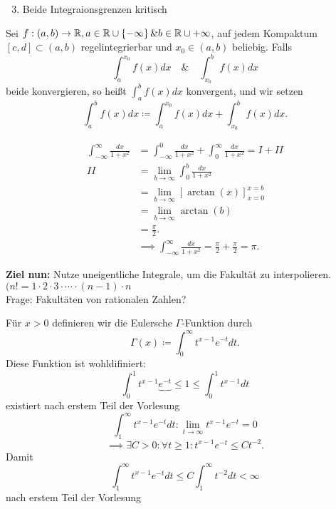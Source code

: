 \begin{enumerate}[label=(\Alph*)]
	\setcounter{enumi}{2}
	\item Beide Integraionsgrenzen kritisch
\end{enumerate}

\begin{subdefinition}
	Sei $ f: (a, b) \to \mathbb{R}, a \in \mathbb{R} \cup \left\{ -\infty \right\} \& b \in \mathbb{R} \cup {+\infty} $, auf jedem Kompaktum $ [c, d] \subset (a, b) $ regelintegrierbar und $ x_0 \in (a, b) $ beliebig. Falls
	\[
		\int_{a}^{x_0}f(x) dx \quad \& \quad \int_{x_0}^{b}f(x) dx
	\]
	beide konvergieren, so heißt $ \int_{a}^{b} f(x) dx $ konvergent, und wir setzen
	\[
		\int_{a}^{b}f(x) dx \coloneqq \int_{a}^{x_0} f(x) dx + \int_{x_0}^{b} f(x) dx.
	\]
	
\end{subdefinition}

\begin{subexample}
	\begin{align*}
		\int_{-\infty}^{\infty} \frac{dx}{ 1 + x^2 } &= \int_{-\infty}^{0} \frac{ dx }{ 1 + x^2 } + \int_{0}^{\infty} \frac{dx}{ 1 + x^2 } = I + II \\
		II &= \lim_{b \to \infty} \int_{0}^{b} \frac{dx}{ 1 + x^2 } \\
		~&= \lim_{b \to \infty} \left[ \arctan (x) \right]_{x = 0} ^{x = b}  \\
		~&= \lim_{b \to \infty} \arctan (b) \\
		~&= \frac{ \pi }{ 2 } . \\
		~&\implies \int_{-\infty}^{\infty} \frac{dx}{ 1 + x^2 } = \frac{ \pi }{ 2 } + \frac{ \pi }{ 2 } = \pi .
	\end{align*}
\end{subexample}

\textbf{Ziel nun:} Nutze uneigentliche Integrale, um die Fakultät zu interpolieren. $ ( n! = 1 \cdot 2\cdot 3\cdot \dotsb \cdot (n-1) \cdot n $\\
Frage: Fakultäten von rationalen Zahlen?\\

\begin{subdefinition}
	Für $ x > 0 $ definieren wir die Eulersche $ \Gamma $-Funktion durch
	\[
		\Gamma(x) \coloneqq \int_{0}^{\infty} t ^{x-1} e^{-t} dt. 
	\]
	Diese Funktion ist wohldifiniert:
	\[
		\int_{0}^{1} t ^{x - 1} \underbrace{e^{-t} }{\leq 1} \leq \int_{0}^{1} t ^{x - 1} dt
	\]
	existiert nach erstem Teil der Vorlesung
	\[
		\int_{1}^{\infty}t ^{x-1} e^{-t} dt : \lim_{t \to \infty} t ^{x-1} e^{-t} = 0
	\]
	\[
		\implies \exists C > 0: \forall t \geq 1 : t ^{x-1} e^{-t} \leq C t ^{-2} .
	\]
	Damit
	\[
		\int_{1}^{\infty}t ^{x-1} e^{-t} dt \leq C \int_{1}^{\infty} t ^{-2} dt < \infty
	\]
	nach erstem Teil der Vorlesung
\end{subdefinition}

